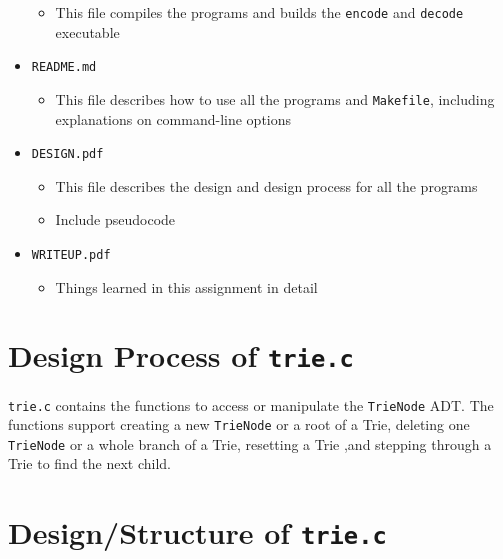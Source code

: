\documentclass[12pt]{article}
\begin{document}
\begin{itemize}
   \begin{itemize}
     \item This file compiles the programs and builds the \texttt{encode} and \texttt{decode} executable
   \end{itemize}
   \item \texttt{README.md}
   \begin{itemize}
     \item This file describes how to use all the programs and \texttt{Makefile}, including explanations on command-line options
   \end{itemize}
   \item \texttt{DESIGN.pdf}
   \begin{itemize}
     \item This file describes the design and design process for all the programs
     \item Include pseudocode
   \end{itemize}
   \item \texttt{WRITEUP.pdf}
   \begin{itemize}
     \item Things learned in this assignment in detail
   \end{itemize}
 \end{itemize}

\section{Design Process of \texttt{trie.c}}

\texttt{trie.c} contains the functions to access or manipulate the \texttt{TrieNode} ADT. The functions support creating a new \texttt{TrieNode} or a root of a Trie, deleting one \texttt{TrieNode} or a whole branch of a Trie, resetting a Trie ,and stepping through a Trie to find the next child. \\

\section{Design/Structure of \texttt{trie.c}}
\end{document}
